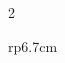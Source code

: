 \documentclass[10pt]{article} %
\begin{document}
\begin{paracol}{2}
\begin{supertabular}{rp{6.7cm}}

\end{supertabular}



%
%

\end{paracol}
\end{document}
